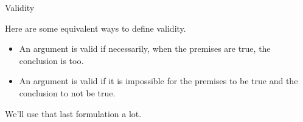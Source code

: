 \documentclass[ignorenonframetext,]{beamer}
\providecommand{\tightlist}{%
  \setlength{\itemsep}{0pt}\setlength{\parskip}{0pt}}
\renewcommand{\,}{\text{, }}
\begin{document}
\begin{frame}{Validity}
\protect\hypertarget{validity}{}

Here are some equivalent ways to define validity.

\begin{itemize}
\tightlist
\item
  An argument is valid if necessarily, when the premises are true, the
  conclusion is too.
\item
  An argument is valid if it is impossible for the premises to be true
  and the conclusion to not be true.
\end{itemize}

We'll use that last formulation a lot.

\end{frame}
\end{document}
